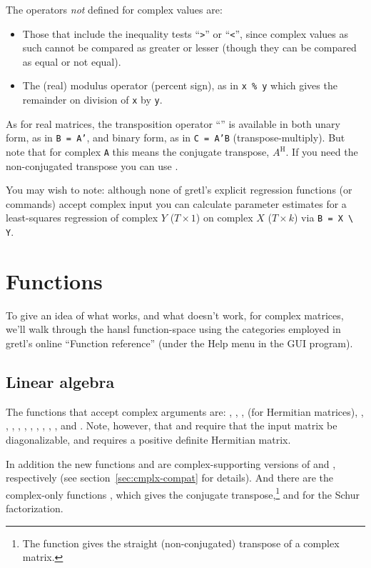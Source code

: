 The operators \textit{not} defined for complex values are:
\begin{itemize}
\item Those that include the inequality tests ``\verb+>+'' or
  ``\verb+<+'', since complex values as such cannot be compared as
  greater or lesser (though they can be compared as equal or not
  equal).
\item The (real) modulus operator (percent sign), as in \texttt{x \%
    y} which gives the remainder on division of \texttt{x} by
  \texttt{y}.
\end{itemize}

As for real matrices, the transposition operator ``'' is
available in both unary form, as in \texttt{B = A'}, and binary form,
as in \texttt{C = A'B} (transpose-multiply). But note that for complex
\texttt{A} this means the conjugate transpose, $A^\mathrm{H}$. If you
need the non-conjugated transpose you can use .

You may wish to note: although none of gretl's explicit regression
functions (or commands) accept complex input you can calculate
parameter estimates for a least-squares regression of complex $Y$
($T \times 1$) on complex $X$ ($T \times k$) via \verb|B = X \ Y|.

\section{Functions}
\label{sec:cmplx-funcs}

To give an idea of what works, and what doesn't work, for complex
matrices, we'll walk through the hansl function-space using the
categories employed in gretl's online ``Function reference'' (under the
\textsf{Help} menu in the GUI program).

\subsection{Linear algebra}

The functions that accept complex arguments are: ,
, ,  (for Hermitian matrices),
, , , , ,
, , , , , and
. Note, however, that  and  require
that the input matrix be diagonalizable, and  requires a
positive definite Hermitian matrix.

In addition the new functions  and  are
complex-supporting versions of  and ,
respectively (see section~\ref{sec:cmplx-compat} for details). And
there are the complex-only functions , which gives the
conjugate transpose,\footnote{The  function gives the
  straight (non-conjugated) transpose of a complex matrix.} and
 for the Schur factorization.

